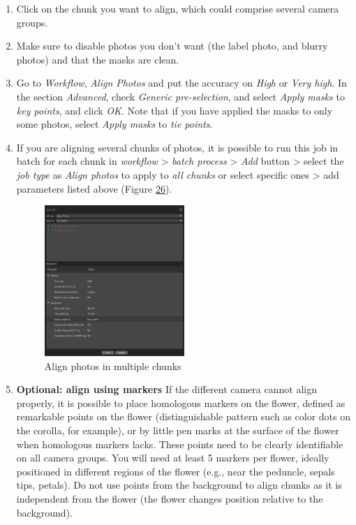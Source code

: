 \documentclass[
]{book}
\begin{document}
\begin{enumerate}
\def\labelenumi{\arabic{enumi}.}
\item
  Click on the chunk you want to align, which could comprise several
  camera groups.
\item
  Make sure to disable photos you don't want (the label photo, and
  blurry photos) and that the masks are clean.
\item
  Go to \emph{Workflow}, \emph{Align Photos} and put the accuracy on \emph{High} or
  \emph{Very high}. In the section \emph{Advanced}, check \emph{Generic
  pre-selection}, and select \emph{Apply masks} to \emph{key points}, and click
  \emph{OK}. Note that if you have applied the masks to only some photos,
  select \emph{Apply masks} to \emph{tie points}.
\item
  If you are aligning several chunks of photos, it is possible to run
  this job in batch for each chunk in \emph{workflow} \textgreater{} \emph{batch process} \textgreater{}
  \emph{Add} button \textgreater{} select the \emph{job type} as \emph{Align photos} to apply to
  \emph{all chunks} or select specific ones \textgreater{} add parameters listed above
  (Figure \protect\hyperlink{batch_alignment}{26}).

  \begin{figure}
  \hypertarget{batch_alignment}{%
  \centering
  \includegraphics[width=0.5\textwidth,height=\textheight]{Figures/metashape_batch_align.png}
  \caption{Align photos in multiple
  chunks}\label{batch_alignment}
  }
  \end{figure}
\item
  \textbf{Optional: align using markers} If the different camera cannot
  align properly, it is possible to place homologous markers on the
  flower, defined as remarkable points on the flower (distinguishable
  pattern such as color dots on the corolla, for example), or by
  little pen marks at the surface of the flower when homologous
  markers lacks. These points need to be clearly identifiable on all
  camera groups. You will need at least 5 markers per flower, ideally
  positioned in different regions of the flower (e.g., near the
  peduncle, sepals tips, petals). Do not use points from the
  background to align chunks as it is independent from the flower (the
  flower changes position relative to the background).


\end{enumerate}
\end{document}
